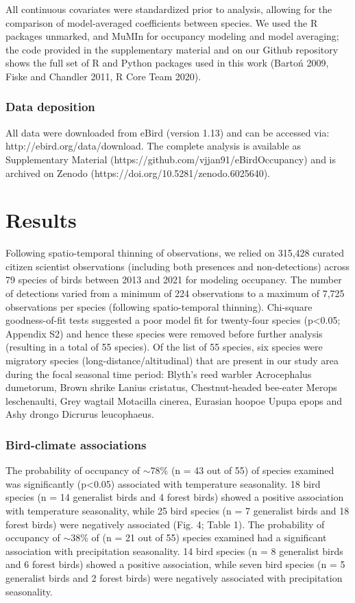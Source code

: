 All continuous covariates were standardized prior to analysis, allowing for the comparison of model-averaged coefficients between species.
We used the R packages unmarked, and MuMIn for occupancy modeling and model averaging; the code provided in the supplementary material and on our Github repository shows the full set of R and Python packages used in this work (Bartoń 2009, Fiske and Chandler 2011, R Core Team 2020).

\subsubsection*{Data deposition}

All data were downloaded from eBird (version 1.13) and can be accessed via: http://ebird.org/data/download.
The complete analysis is available as Supplementary Material (https://github.com/vjjan91/eBirdOccupancy) and is archived on Zenodo (https://doi.org/10.5281/zenodo.6025640).

\section*{Results}

Following spatio-temporal thinning of observations, we relied on 315,428 curated citizen scientist observations (including both presences and non-detections) across 79 species of birds between 2013 and 2021 for modeling occupancy.
The number of detections varied from a minimum of 224 observations to a maximum of 7,725 observations per species (following spatio-temporal thinning).
Chi-square goodness-of-fit tests suggested a poor model fit for twenty-four species (p<0.05; Appendix S2) and hence these species were removed before further analysis (resulting in a total of 55 species).
Of the list of 55 species, six species were migratory species (long-distance/altitudinal) that are present in our study area during the focal seasonal time period: Blyth's reed warbler Acrocephalus dumetorum, Brown shrike Lanius cristatus, Chestnut-headed bee-eater Merops leschenaulti, Grey wagtail Motacilla cinerea, Eurasian hoopoe Upupa epops and Ashy drongo Dicrurus leucophaeus.


\subsubsection*{Bird-climate associations}

The probability of occupancy of $\sim$78\% (n = 43 out of 55) of species examined was significantly (p<0.05) associated with temperature seasonality.
18 bird species (n = 14 generalist birds and 4 forest birds) showed a positive association with temperature seasonality, while 25 bird species (n = 7 generalist birds and 18 forest birds) were negatively associated (Fig.
4; Table 1).
The probability of occupancy of $\sim$38\% of (n = 21 out of 55) species examined had a significant association with precipitation seasonality.
14 bird species (n = 8 generalist birds and 6 forest birds) showed a positive association, while seven bird species (n = 5 generalist birds and 2 forest birds) were negatively associated with precipitation seasonality.

